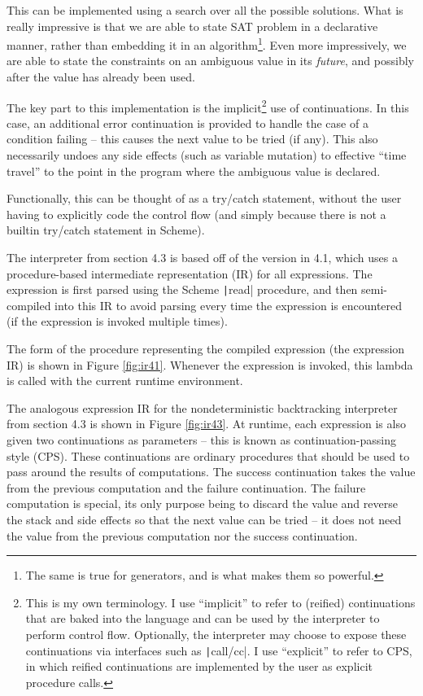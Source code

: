 \documentclass[]{article}
\begin{document}
This can be implemented using a search over all the possible solutions. What is really impressive is that we are able to state SAT problem in a declarative manner, rather than embedding it in an algorithm\footnote{The same is true for generators, and is what makes them so powerful.}. Even more impressively, we are able to state the constraints on an ambiguous value in its \textit{future}, and possibly after the value has already been used.

The key part to this implementation is the implicit\footnote{This is my own terminology. I use ``implicit'' to refer to (reified) continuations that are baked into the language and can be used by the interpreter to perform control flow. Optionally, the interpreter may choose to expose these continuations via interfaces such as \texttt|call/cc|. I use ``explicit'' to refer to CPS, in which reified continuations are implemented by the user as explicit procedure calls.} use of continuations. In this case, an additional error continuation is provided to handle the case of a condition failing -- this causes the next value to be tried (if any). This also necessarily undoes any side effects (such as variable mutation) to effective ``time travel'' to the point in the program where the ambiguous value is declared.

Functionally, this can be thought of as a try/catch statement, without the user having to explicitly code the control flow (and simply because there is not a builtin try/catch statement in Scheme).

The interpreter from section 4.3 is based off of the version in 4.1, which uses a procedure-based intermediate representation (IR) for all expressions. The expression is first parsed using the Scheme \texttt|read| procedure, and then semi-compiled into this IR to avoid parsing every time the expression is encountered (if the expression is invoked multiple times).

The form of the procedure representing the compiled expression (the expression IR) is shown in Figure \ref{fig:ir41}. Whenever the expression is invoked, this lambda is called with the current runtime environment.

The analogous expression IR for the nondeterministic backtracking interpreter from section 4.3 is shown in Figure \ref{fig:ir43}. At runtime, each expression is also given two continuations as parameters -- this is known as continuation-passing style (CPS). These continuations are ordinary procedures that should be used to pass around the results of computations. The success continuation takes the value from the previous computation and the failure continuation. The failure computation is special, its only purpose being to discard the value and reverse the stack and side effects so that the next value can be tried -- it does not need the value from the previous computation nor the success continuation.
\end{document}
